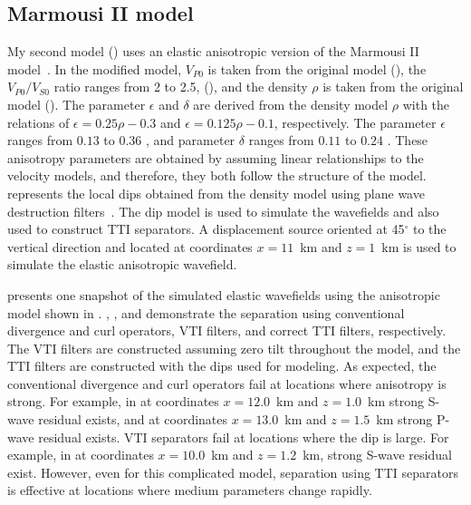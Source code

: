 \subsection{Marmousi II model}
My second model () uses an elastic
anisotropic version of the Marmousi II model~\cite[]{marmousi}. In the
modified model, $V_{P0}$ is taken from the original model
(), the $V_{P0}/V_{S0}$ ratio ranges from 2 to 2.5,
(), and the density $\rho$ is taken from the
original model (). The parameter $\epsilon$ and
$\delta$ are derived from the density model $\rho$ with the relations
of $\epsilon=0.25\rho-0.3$ and $\epsilon=0.125\rho-0.1$,
respectively. The parameter $\epsilon$ ranges from $0.13$ to $0.36$
, and parameter $\delta$ ranges from $0.11$
to $0.24$ . These anisotropy parameters are
obtained by assuming linear relationships to the velocity models, and
therefore, they both follow the structure of the
model.  represents the local dips obtained from the
density model using plane wave destruction
filters~\cite[]{GEO67-06-19461960}. The dip model is used to simulate
the wavefields and also used to construct TTI separators. A
displacement source oriented at 45$^\circ$ to the vertical direction
and located at coordinates $x=11$~km and $z=1$~km is used to simulate
the elastic anisotropic wavefield.

 presents one snapshot of the simulated elastic 
wavefields using the anisotropic model shown
in . ,
, and  demonstrate the separation using conventional 
divergence and curl operators, VTI filters, and correct TTI filters,
respectively. The VTI filters are constructed assuming zero tilt
throughout the model, and the TTI filters are constructed with the
dips used for modeling. As expected, the conventional divergence and
curl operators fail at locations where anisotropy is strong.  For
example, in  at coordinates $x=12.0$~km and $z=1.0$~km
strong S-wave residual exists, and at coordinates $x=13.0$~km and
$z=1.5$~km strong P-wave residual exists. VTI separators fail at
locations where the dip is large.  For example, in  at
coordinates $x=10.0$~km and $z=1.2$~km, strong S-wave residual
exist. However, even for this complicated model, separation using TTI
separators is effective at locations where medium parameters change
rapidly.



